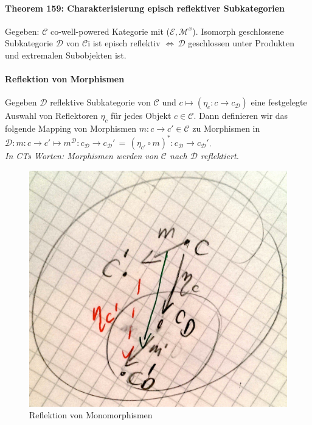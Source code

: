 
\paragraph{Theorem 159: Charakterisierung episch reflektiver Subkategorien} 
Gegeben: $\mathcal{C}$ co-well-powered Kategorie mit ($\mathcal{E},\mathcal{M}^x$). Isomorph geschlossene Subkategorie $\mathcal{D}$ von $\mathcal{C}$i ist episch reflektiv $\Leftrightarrow \, \mathcal{D} $ geschlossen unter Produkten und extremalen Subobjekten ist. 
 
 
\paragraph{ Reflektion von Morphismen}  
Gegeben $\mathcal{D}$ reflektive Subkategorie von $\mathcal{C}$ und $c \mapsto (\eta_c : c \rightarrow c_\mathcal{D})$ eine festgelegte Auswahl von Reflektoren $\eta_c$ für jedes Objekt $c \in \mathcal{C}$.
Dann definieren wir das folgende Mapping von Morphismen $m: c \rightarrow c' \in \mathcal{C}$ zu Morphismen in $\mathcal{D}: m : c \rightarrow c' \mapsto m^\mathcal{D}: c_\mathcal{D} \rightarrow c_\mathcal{D}' \, = \, (\eta_{c'} \circ m)^* : c_\mathcal{D} \rightarrow c_\mathcal{D}'$.  \\
\emph{In CTs Worten: Morphismen werden von $\mathcal{C}$ nach $\mathcal{D}$ reflektiert.}

\begin{figure}[h]
\noindent \centering{}\includegraphics[scale=0.09]{Abbildungen/160}\caption{Reflektion von Monomorphismen}
\end{figure}

